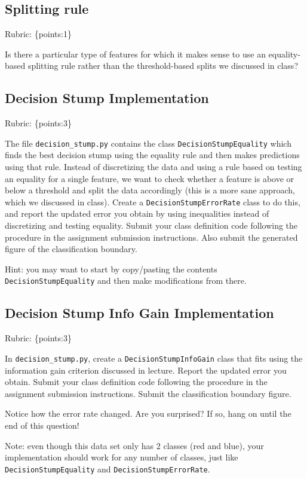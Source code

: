 \documentclass{article}
\def\rubric#1{\gre{Rubric: \{#1\}}}{}
\def\blu#1{{\color{blu}#1}}
\def\gre#1{{\color{gre}#1}}
\begin{document}
	\subsection{Splitting rule}
	\rubric{points:1}

	Is there a particular type of features for which it makes sense to use an equality-based splitting rule rather than the threshold-based splits we discussed in class?


	\subsection{Decision Stump Implementation}
	\rubric{points:3}

	The file \texttt{decision\string_stump.py} contains the class \texttt{DecisionStumpEquality} which
	finds the best decision stump using the equality rule and then makes predictions using that
	rule. Instead of discretizing the data and using a rule based on testing an equality for
	a single feature, we want to check whether a feature is above or below a threshold and
	split the data accordingly (this is a more sane approach, which we discussed in class).
	\blu{Create a \texttt{DecisionStumpErrorRate} class to do this, and report the updated error you
		obtain by using inequalities instead of discretizing and testing equality.
		Submit your class definition code following the procedure in the assignment submission instructions.
		Also submit the generated figure of the classification boundary.}

	Hint: you may want to start by copy/pasting the contents \texttt{DecisionStumpEquality} and then make modifications from there.


	\subsection{Decision Stump Info Gain Implementation}
	\rubric{points:3}

	In \texttt{decision\string_stump.py}, \blu{create a \texttt{DecisionStumpInfoGain} class that
		fits using the information gain criterion discussed in lecture.
		Report the updated error you obtain.
		Submit your class definition code following the procedure in the assignment submission instructions.
		Submit the classification boundary figure.}

	Notice how the error rate changed. Are you surprised? If so, hang on until the end of this question!

	Note: even though this data set only has 2 classes (red and blue), your implementation should work
	for any number of classes, just like \texttt{DecisionStumpEquality} and \texttt{DecisionStumpErrorRate}.
\end{document}

